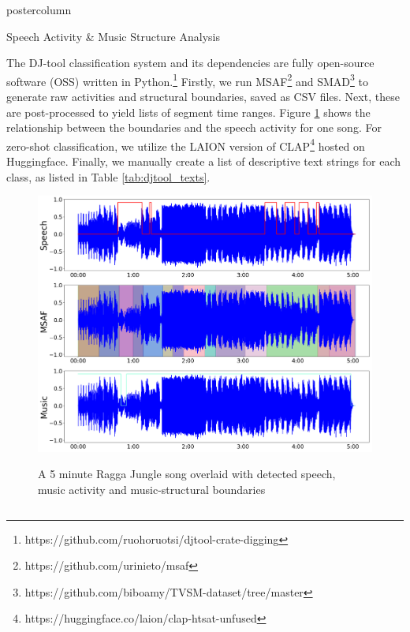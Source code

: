 \documentclass{beamer}
\begin{document}
\begin{frame}
\begin{columns}
\begin{column}{.43\textwidth}
\begin{beamercolorbox}[center]{postercolumn}
\begin{minipage}{.98\textwidth}
{%
					\begin{myblock}{Speech Activity \& Music Structure Analysis}
					
					The DJ-tool classification system and its dependencies are fully open-source software (OSS) written in Python.\footnote{https://github.com/ruohoruotsi/djtool-crate-digging} Firstly, we run MSAF\footnote{https://github.com/urinieto/msaf} and SMAD\footnote{https://github.com/biboamy/TVSM-dataset/tree/master} to generate raw activities and structural boundaries, saved as CSV files\cite{Hung2022, nieto2016systematic}. Next, these are post-processed to yield lists of segment time ranges. Figure \ref{fig:msafsmadplot} shows the relationship between the boundaries and the speech activity for one song. For zero-shot classification, we utilize the LAION version of CLAP\footnote{https://huggingface.co/laion/clap-htsat-unfused} hosted on Huggingface\cite{elizalde2022claplearningaudioconcepts, WuClap2023}. Finally, we manually create a list of descriptive text strings for each class, as listed in Table \ref{tab:djtool_texts}.
					
					\vspace{0.7em}
	
			\begin{figure}
			 \centerline{
			 	\includegraphics[alt={SMAD \& MSAF Analysis signals}, width=0.6\columnwidth]{img/smad_msaf.png}}
			 \caption{A 5 minute Ragga Jungle song overlaid with detected speech, \\ music activity and music-structural boundaries}
			 \label{fig:msafsmadplot}
			\end{figure}


\end{myblock}}
\end{minipage}
\end{beamercolorbox}
\end{column}
\end{columns}
\end{frame}
\end{document}

